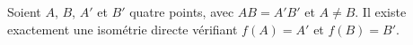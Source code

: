 Soient $A$, $B$, $A'$ et $B'$  quatre points, avec $AB=A'B'$ et $A\neq B$. Il existe exactement une isométrie directe vérifiant $f(A)=A'$ et $f(B)=B'$.

\begin{reponses}
\end{reponses}

